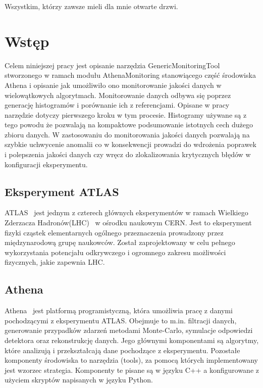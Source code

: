 \begin{dedication}
Wszystkim,\break
którzy zawsze mieli dla mnie otwarte drzwi.
\end{dedication}

\section{Wstęp}
Celem niniejszej pracy jest opisanie narzędzia \mbox{GenericMonitoringTool} stworzonego w ramach modułu \mbox{AthenaMonitoring} stanowiącego część środowiska Athena i opisanie jak umożliwiło ono monitorowanie jakości danych w wielowątkowych algorytmach. 
Monitorowanie danych odbywa się poprzez generację histogramów i porównanie ich z referencjami. Opisane w pracy narzędzie dotyczy pierwszego kroku w tym procesie.
Histogramy używane są z tego powodu że pozwalają na kompaktowe podsumowanie istotnych cech dużego zbioru danych. 
W zastosowaniu do monitorowania jakości danych pozwalają na szybkie uchwycenie anomalii co w konsekwencji prowadzi do wdrożenia poprawek i polepszenia jakości danych czy wręcz do zlokalizowania krytycznych błędów w konfiguracji eksperymentu. 

\subsection{Eksperyment ATLAS}
ATLAS~\cite{cern-atlas} jest jednym z czterech głównych eksperymentów w ramach Wielkiego Zderzacza Hadronów(LHC)~\cite{cern-lhc} w ośrodku naukowym CERN. 
Jest to eksperyment fizyki cząstek elementarnych ogólnego przeznaczenia prowadzony przez międzynarodową grupę naukowców. 
Został zaprojektowany w celu pełnego wykorzystania potencjału odkrywczego i ogromnego zakresu możliwości fizycznych, jakie zapewnia LHC.

\subsection{Athena}
Athena~\cite{cern-athena} jest platformą programistyczną, która umożliwia pracę z danymi pochodzącymi z eksperymentu ATLAS. 
Obejmuje to m.in. filtracji danych, generowanie przypadków zdarzeń metodami Monte-Carlo, symulacje odpowiedzi detektora oraz rekonstrukcję danych. 
Jego głównymi komponentami są algorytmy, które analizują i przekształcają dane pochodzące z eksperymentu. 
Pozostałe komponenty środowiska to narzędzia (tools), za pomocą których implementowany jest wzorzec strategia. 
Komponenty te pisane są w języku C++ a konfigurowane z użyciem skryptów napisanych w języku Python. 

